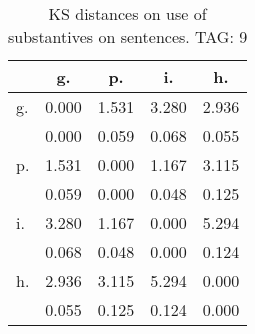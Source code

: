\begin{table}[h!]
\begin{center}
\begin{tabular}{| l | c | c | c | c |}\hline
 & g. & p. & i. & h. \\\hline
g. & 0.000  & 1.531  & 3.280  & 2.936 \\\hline
 & 0.000  & 0.059  & 0.068  & 0.055 \\\hline
p. & 1.531  & 0.000  & 1.167  & 3.115 \\\hline
 & 0.059  & 0.000  & 0.048  & 0.125 \\\hline
i. & 3.280  & 1.167  & 0.000  & 5.294 \\\hline
 & 0.068  & 0.048  & 0.000  & 0.124 \\\hline
h. & 2.936  & 3.115  & 5.294  & 0.000 \\\hline
 & 0.055  & 0.125  & 0.124  & 0.000 \\\hline
\end{tabular}
\caption{KS distances on use of substantives on sentences. TAG: 9}
\end{center}
\end{table}